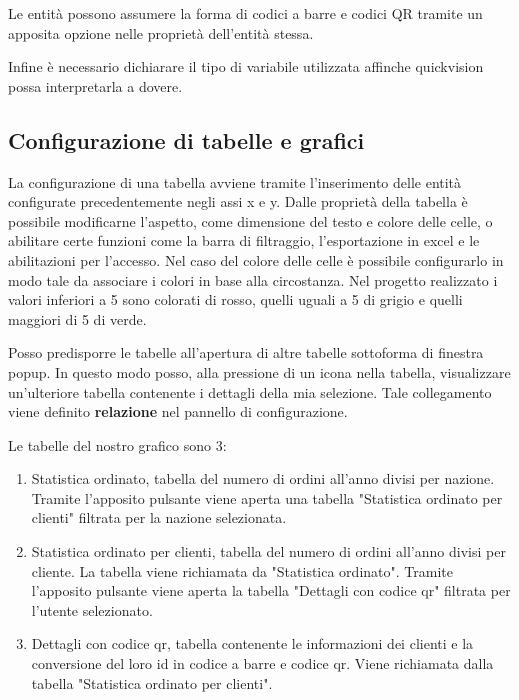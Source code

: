 \documentclass[target=bach,aauheader=,style=]{thud}
\begin{document}
Le entità possono assumere la forma di codici a barre e codici QR tramite un apposita opzione nelle proprietà dell'entità stessa.

Infine è necessario dichiarare il tipo di variabile utilizzata affinche quickvision possa interpretarla a dovere.



%
%

\subsection{Configurazione di tabelle e grafici}
La configurazione di una tabella avviene tramite l'inserimento delle entità configurate precedentemente negli assi x e y.
Dalle proprietà della tabella è possibile modificarne l'aspetto, come dimensione del testo e colore delle celle, o abilitare certe funzioni come la barra di filtraggio, l'esportazione in excel e le abilitazioni per l'accesso.
Nel caso del colore delle celle è possibile configurarlo in modo tale da associare i colori in base alla circostanza.
Nel progetto realizzato i valori inferiori a 5 sono colorati di rosso, quelli uguali a 5 di grigio e quelli maggiori di 5 di verde.

Posso predisporre le tabelle all'apertura di altre tabelle sottoforma di finestra popup.
In questo modo posso, alla pressione di un icona nella tabella, visualizzare un'ulteriore tabella contenente i dettagli della mia selezione.
Tale collegamento viene definito \textbf{relazione} nel pannello di configurazione.

Le tabelle del nostro grafico sono 3:
\begin{enumerate}
    \item Statistica ordinato, tabella del numero di ordini all'anno divisi per nazione. Tramite l'apposito pulsante viene aperta una tabella "Statistica ordinato per clienti" filtrata per la nazione selezionata.
    \item Statistica ordinato per clienti, tabella del numero di ordini all'anno divisi per cliente. La tabella viene richiamata da "Statistica ordinato". Tramite l'apposito pulsante viene aperta la tabella "Dettagli con codice qr" filtrata per l'utente selezionato.
    \item Dettagli con codice qr, tabella contenente le informazioni dei clienti e la conversione del loro id in codice a barre e codice qr. Viene richiamata dalla tabella "Statistica ordinato per clienti".
\end{enumerate}
\end{document}
